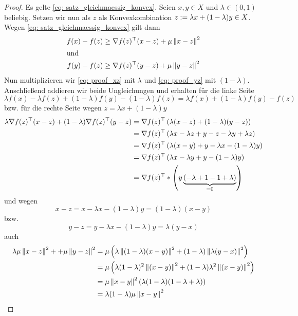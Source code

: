 \documentclass[ %
ngerman, %
a4paper, 
12pt,%
sectionreset, %
chapterstyle=framed, %
sectionstyle=pure, %
titlefont=osfamily %
]{../texmf/tex/latex/mathscriptMathTUD/mathscriptMathTUD}
\begin{document}
\begin{proof}
	Es gelte \eqref{eq: satz_gleichmaessig_konvex}. Seien $x,y \in X$ und $\lambda \in (0,1)$ beliebig. Setzen wir nun als $z$ als Konvexkombination $z \mathrel{:=} \lambda x +(1-\lambda)y \in X$. Wegen \eqref{eq: satz_gleichmaessig_konvex} gilt dann 
	\begin{align}
		f(x) - f(z) &\geq \nabla f(z)^{\top}(x-z) + \mu \left\lVert x-z \right\rVert^2 \label{eq: proof_xz} \\
	\intertext{und}
		f(y) - f(z) &\geq \nabla f(z)^{\top}(y-z) + \mu \left\lVert y-z \right\rVert^2 \label{eq: proof_yz}
	\end{align}
	Nun multiplizieren wir \eqref{eq: proof_xz} mit $\lambda$ und \eqref{eq: proof_yz} mit $(1-\lambda)$. Anschließend addieren wir beide Ungleichungen und erhalten für die linke Seite 
	\begin{equation*}
		\lambda f(x) - \lambda f(z) + (1-\lambda) f(y) - (1-\lambda) f(z)
		= \lambda f(x) + (1-\lambda) f(y) - f(z)
	\end{equation*}
	bzw. für die rechte Seite wegen $z = \lambda x + (1-\lambda) y$
	\begin{align*}
		\lambda  \nabla f(z)^{\top}(x-z) + (1-\lambda) \nabla f(z)^{\top}(y-z) 
		&= \nabla f(z)^{\top} \left( \lambda(x-z) + (1-\lambda) (y-z) \right) \\
		&= \nabla f(z)^{\top} \left( \lambda x - \lambda z + y - z - \lambda y + \lambda z \right) \\
		&= \nabla f(z)^{\top} \left( \lambda (x-y) + y - \lambda x - (1-\lambda) y \right) \\
		&= \nabla f(z)^{\top} \left( \lambda x - \lambda y + y - (1-\lambda) y \right) \\
		&= \nabla f(z)^{\top} * \left( y \underbrace{( -\lambda + 1 - 1 + \lambda)}_{=0} \right) 
	\end{align*}
	und wegen
	\begin{equation*}
		x-z = x - \lambda x - (1-\lambda)y = (1-\lambda) (x-y)
	\end{equation*}
	bzw. 
	\begin{equation*}
		y-z = y - \lambda x - (1-\lambda)y = \lambda (y-x)
	\end{equation*}
	auch
	\begin{align*}
		\lambda \mu \left\lVert x-z \right\rVert^2 + + \mu \left\lVert y-z \right\rVert^2 
		&= \mu \left( \lambda \left\lVert (1-\lambda) (x-y) \right\rVert^2 + (1- \lambda) \left\lVert \lambda (y-x) \right\rVert^2\right) \\
		&= \mu \left( \lambda (1-\lambda)^2 \left\lVert (x-y) \right\rVert^2 + (1- \lambda) \lambda^2 \left\lVert (x-y) \right\rVert^2\right) \\
		&= \mu \left\lVert x-y \right\rVert^2 \left( \lambda (1-\lambda) (1-\lambda + \lambda) \right) \\
		&= \lambda (1-\lambda) \mu \left\lVert x-y \right\rVert^2
	\end{align*}
	

\end{proof}
\end{document}
